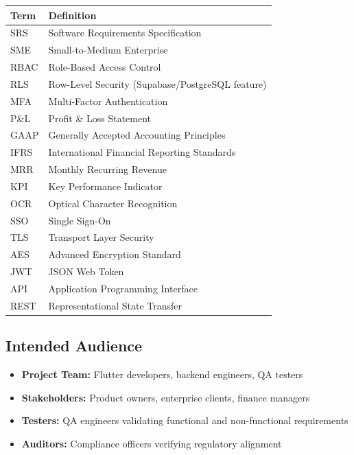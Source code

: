 \documentclass[journal, a4paper, onecolumn, 12pt]{IEEEtran}
\begin{document}
\begin{longtable}{|p{}|p{}|}
\hline
Term & Definition \\ \hline
\hline
SRS & Software Requirements Specification \\ \hline
SME & Small-to-Medium Enterprise \\ \hline
RBAC & Role-Based Access Control \\ \hline
RLS & Row-Level Security (Supabase/PostgreSQL feature) \\ \hline
MFA & Multi-Factor Authentication \\ \hline
P\&L & Profit \& Loss Statement \\ \hline
GAAP & Generally Accepted Accounting Principles \\ \hline
IFRS & International Financial Reporting Standards \\ \hline
MRR & Monthly Recurring Revenue \\ \hline
KPI & Key Performance Indicator \\ \hline
OCR & Optical Character Recognition \\ \hline
SSO & Single Sign-On \\ \hline
TLS & Transport Layer Security \\ \hline
AES & Advanced Encryption Standard \\ \hline
JWT & JSON Web Token \\ \hline
API & Application Programming Interface \\ \hline
REST & Representational State Transfer \\ \hline
\end{longtable}
\subsection{Intended Audience}
\begin{itemize}[leftmargin=*]
\item \textbf{Project Team:} Flutter developers, backend engineers, QA testers
\item \textbf{Stakeholders:} Product owners, enterprise clients, finance managers
\item \textbf{Testers:} QA engineers validating functional and non-functional requirements
\item \textbf{Auditors:} Compliance officers verifying regulatory alignment
\end{itemize}
\end{document}
